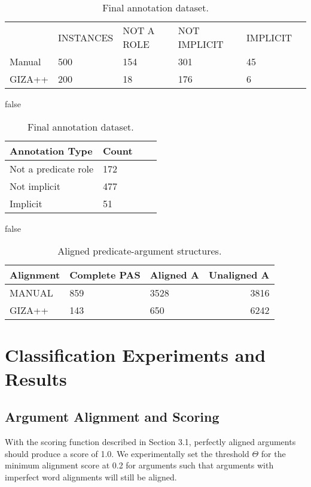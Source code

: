 \documentclass[11pt]{article}
\begin{document}
\begin{table}[h]
	\small
\begin{tabular}{@{}lllllr@{}}
	\toprule
&  \tiny INSTANCES & \tiny NOT A ROLE & \tiny NOT IMPLICIT & \tiny IMPLICIT\\
	 Manual  & 500 & 154 & 301 & 45  \\
	 GIZA++ & 200 & 18 & 176 & 6\\   
	\bottomrule
\end{tabular} 

\if false
\hspace*{3mm}
\begin{tabular}{p{1.5cm}p{0.5cm}ll}
	\hline
	\cline{1-2}
	\scriptsize Annotation Type & \scriptsize Count \\
	\hline
	\scriptsize Not a predicate role & \scriptsize 172 \\
	\hline
	\scriptsize Not implicit & \scriptsize 477 \\
	\hline
	\scriptsize Implicit & \scriptsize51 \\
	\hline
\end{tabular}
\fi
\caption{Final annotation dataset.}\label{tbl:annotationresults}
\end{table}

\if false
\begin{table}[h]
\centering
\begin{tabular}{lllr}
\hline
\cline{1-4}
\small
Alignment & \small Complete PAS & \small Aligned A & \small Unaligned A\\
\hline
\tiny MANUAL  & \small 859 & \small 3528  & \small  3816 \\
\tiny GIZA++  & \small 143 &\small 650  & \small  6242 \\
\hline
\end{tabular}
\caption{Aligned predicate-argument structures.}\label{tab:accents}
\end{table}
\fi

\section{Classification Experiments and Results}

\subsection {Argument Alignment and Scoring}
With the scoring function described in Section 3.1, perfectly aligned arguments should produce a score of 1.0. We experimentally set the threshold $\Theta$ for the minimum alignment score at 0.2 for arguments such that arguments with imperfect word alignments will still be aligned. 
\end{document}
